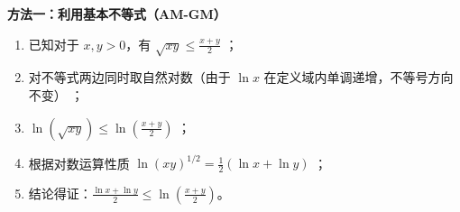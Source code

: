 \begin{proofbox}
\textbf{方法一：利用基本不等式（AM-GM）}
\begin{enumerate}
    \item 已知对于 $x, y > 0$，有 $\sqrt{xy} \leqslant \frac{x+y}{2}$ ；
    \item 对不等式两边同时取自然对数（由于 $\ln x$ 在定义域内单调递增，不等号方向不变） ；
    \item $\ln(\sqrt{xy}) \leqslant \ln\left(\frac{x+y}{2}\right)$ ；
    \item 根据对数运算性质 $\ln(xy)^{1/2} = \frac{1}{2}(\ln x + \ln y)$ ；
    \item 结论得证：$\frac{\ln x + \ln y}{2} \leqslant \ln\left(\frac{x+y}{2}\right)$。
\end{enumerate}
\end{proofbox}